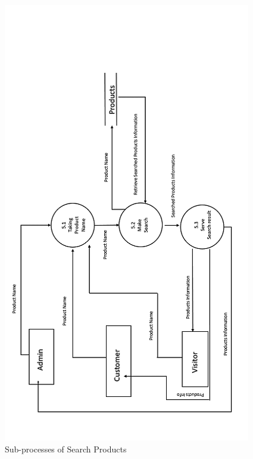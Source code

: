 \begin{figure}
 \centering
\includegraphics{figures/5final.png}
\caption{Sub-processes of Search Products}
\end{figure}




